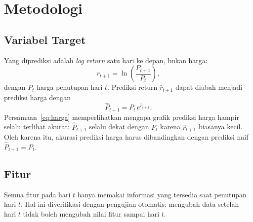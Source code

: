 \documentclass[11pt,a4paper]{article}
\begin{document}
\section{Metodologi}

\subsection{Variabel Target}
Yang diprediksi adalah \emph{log return} satu hari ke depan, bukan harga:
\begin{equation}
  r_{t+1} = \ln\!\left(\frac{P_{t+1}}{P_t}\right),
\end{equation}
dengan $P_t$ harga penutupan hari $t$. Prediksi return $\hat r_{t+1}$ dapat diubah menjadi
prediksi harga dengan
\begin{equation}
  \hat P_{t+1} = P_t \, e^{\hat r_{t+1}}.
  \label{eq:harga}
\end{equation}
Persamaan~\eqref{eq:harga} memperlihatkan mengapa grafik prediksi harga hampir selalu terlihat
akurat: $\hat P_{t+1}$ selalu dekat dengan $P_t$ karena $\hat r_{t+1}$ biasanya kecil. Oleh
karena itu, akurasi prediksi harga harus dibandingkan dengan prediksi naif
$\hat P_{t+1} = P_t$.

\subsection{Fitur}
Semua fitur pada hari $t$ hanya memakai informasi yang tersedia saat penutupan hari $t$.
Hal ini diverifikasi dengan pengujian otomatis: mengubah data setelah hari $t$ tidak boleh
mengubah nilai fitur sampai hari $t$.
\end{document}
